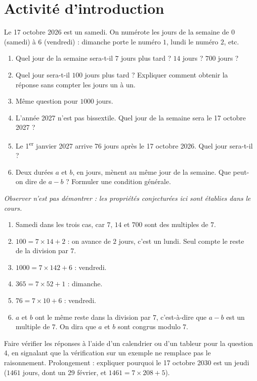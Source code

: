 \section{Activité d'introduction}
\begin{activity}
Le 17 octobre 2026 est un samedi. On numérote les jours de la semaine de $0$ (samedi) à $6$ (vendredi) : dimanche porte le numéro $1$, lundi le numéro $2$, etc.
\begin{enumerate}
\item Quel jour de la semaine sera-t-il $7$ jours plus tard ? $14$ jours ? $700$ jours ?
\item Quel jour sera-t-il $100$ jours plus tard ? Expliquer comment obtenir la réponse sans compter les jours un à un.
\item Même question pour $\num{1000}$ jours.
\item L'année 2027 n'est pas bissextile. Quel jour de la semaine sera le 17 octobre 2027 ?
\item Le 1\textsuperscript{er} janvier 2027 arrive $76$ jours après le 17 octobre 2026. Quel jour sera-t-il ?
\item Deux durées $a$ et $b$, en jours, mènent au même jour de la semaine. Que peut-on dire de $a-b$ ? Formuler une condition générale.
\end{enumerate}
\par\emph{Observer n'est pas démontrer : les propriétés conjecturées ici sont établies dans le cours.}
\end{activity}
\begin{solution}[Activité]
\begin{enumerate}
\item Samedi dans les trois cas, car $7$, $14$ et $700$ sont des multiples de $7$.
\item $100=7\times14+2$ : on avance de $2$ jours, c'est un lundi. Seul compte le reste de la division par $7$.
\item $\num{1000}=7\times142+6$ : vendredi.
\item $365=7\times52+1$ : dimanche.
\item $76=7\times10+6$ : vendredi.
\item $a$ et $b$ ont le même reste dans la division par $7$, c'est-à-dire que $a-b$ est un multiple de $7$. On dira que $a$ et $b$ sont congrus modulo $7$.
\end{enumerate}
\end{solution}
\begin{teachernote}
Faire vérifier les réponses à l'aide d'un calendrier ou d'un tableur pour la question 4, en signalant que la vérification sur un exemple ne remplace pas le raisonnement. Prolongement : expliquer pourquoi le 17 octobre 2030 est un jeudi ($\num{1461}$ jours, dont un 29 février, et $\num{1461}=7\times208+5$).
\end{teachernote}

